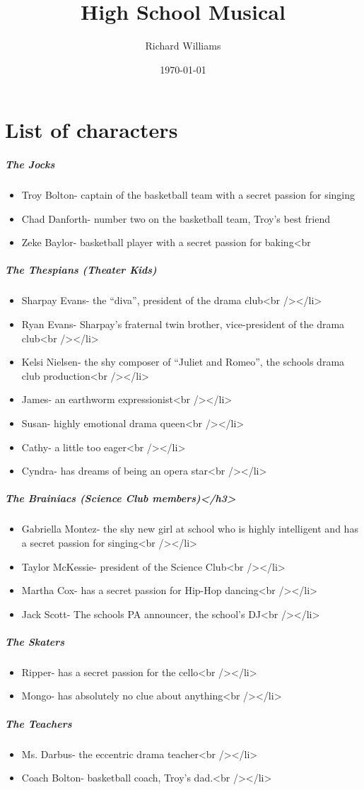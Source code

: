 \documentclass[11pt]{article}
\author{Richard Williams}
\date{\today}
\title{High School Musical}
\begin{document}
\maketitle
\section*{List of characters}
\label{sec:orgc7ba0e0}

\subparagraph*{The Jocks}
\label{sec:org106d4ec}
\begin{itemize}
\item Troy Bolton- captain of the basketball team with a secret passion for  singing
\item Chad Danforth- number two on the basketball team, Troy’s best friend
\item Zeke Baylor- basketball player with a secret passion for baking<br
\end{itemize}
\subparagraph*{The Thespians (Theater Kids)}
\label{sec:org01ca5fc}
\begin{itemize}
\item Sharpay Evans- the “diva”, president of the drama club<br /></li>
\item Ryan Evans- Sharpay’s fraternal twin brother, vice-president of the drama club<br /></li>
\item Kelsi Nielsen- the shy composer of “Juliet and Romeo”, the schools drama club production<br /></li>
\item James- an earthworm expressionist<br /></li>
\item Susan- highly emotional drama queen<br /></li>
\item Cathy- a little too eager<br /></li>
\item Cyndra- has dreams of being an opera star<br /></li>
\end{itemize}
\subparagraph*{The Brainiacs (Science Club members)</h3>}
\label{sec:org28b3a67}
\begin{itemize}
\item Gabriella Montez- the shy new girl at school who is highly intelligent and has a secret passion for singing<br /></li>
\item Taylor McKessie- president of the Science Club<br /></li>
\item Martha Cox- has a secret passion for Hip-Hop dancing<br /></li>
\item Jack Scott- The schools PA announcer, the school’s DJ<br /></li>
\end{itemize}
\subparagraph*{The Skaters}
\label{sec:org1ae7dfc}
\begin{itemize}
\item Ripper- has a secret passion for the cello<br /></li>
\item Mongo- has absolutely no clue about anything<br /></li>
\end{itemize}
\subparagraph*{The Teachers}
\label{sec:org85178fa}
\begin{itemize}
\item Ms. Darbus- the eccentric drama teacher<br /></li>
\item Coach Bolton- basketball coach, Troy’s dad.<br /></li>
\end{itemize}
\end{document}
